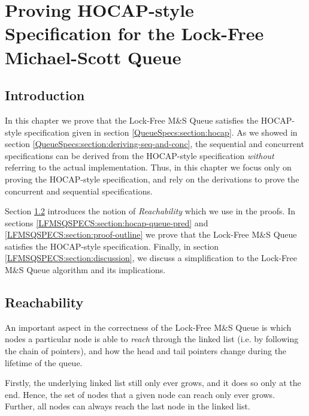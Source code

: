 \documentclass[a4paper, 10pt]{report}
\theoremstyle{definition}
\newcommand{\msq}{M\&S Queue}
\newcommand{\lfmsq}{Lock-Free \msq{}}
\begin{document}

\chapter{Proving HOCAP-style Specification for the Lock-Free Michael-Scott Queue}
\label{ch:LFMSQSPECS}

\section{Introduction}
\label{LFMSQSPECS:section:introduction}

In this chapter we prove that the \lfmsq{} satisfies the HOCAP-style specification given in section \ref{QueueSpecs:section:hocap}. As we showed in section \ref{QueueSpecs:section:deriving-seq-and-conc}, the sequential and concurrent specifications can be derived from the HOCAP-style specification \emph{without} referring to the actual implementation. Thus, in this chapter we focus only on proving the HOCAP-style specification, and rely on the derivations to prove the concurrent and sequential specifications.

Section \ref{LFMSQSPECS:section:reachability} introduces the notion of \textit{Reachability} which we use in the proofs. In sections \ref{LFMSQSPECS:section:hocap-queue-pred} and \ref{LFMSQSPECS:section:proof-outline} we prove that the \lfmsq{} satisfies the HOCAP-style specification. Finally, in section \ref{LFMSQSPECS:section:discussion}, we discuss a simplification to the \lfmsq{} algorithm and its implications.

\section{Reachability}
\label{LFMSQSPECS:section:reachability}

An important aspect in the correctness of the \lfmsq{} is which nodes a particular node is able to \textit{reach} through the linked list (i.e. by following the chain of pointers), and how the head and tail pointers change during the lifetime of the queue.

Firstly, the underlying linked list still only ever grows, and it does so only at the end. Hence, the set of nodes that a given node can reach only ever grows. Further, all nodes can always reach the last node in the linked list.
\end{document}
